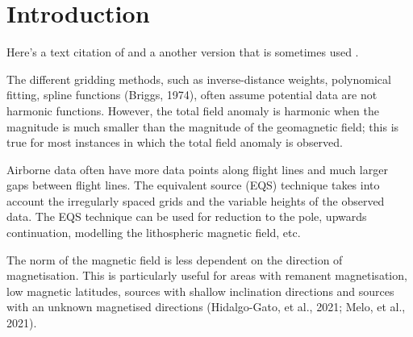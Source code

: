 
\section{Introduction}

Here's a text citation of \citet{OliveiraJr2015}
and a another version that is sometimes used \citep{OliveiraJr2015}.

The different gridding methods, such as inverse-distance weights, polynomical fitting, spline functions (Briggs, 1974), often assume potential data are not harmonic functions. However, the total field anomaly is harmonic when the magnitude is much smaller than the magnitude of the geomagnetic field; this is true for most instances in which the total field anomaly is observed. 

Airborne data often have more data points along flight lines and much larger gaps between flight lines. The equivalent source (EQS) technique takes into account the irregularly spaced grids and the variable heights of the observed data. The EQS technique can be used for reduction to the pole, upwards continuation, modelling the lithospheric magnetic field, etc.

The norm of the magnetic field is less dependent on the direction of magnetisation. This is particularly useful for areas with remanent magnetisation, low magnetic latitudes, sources with shallow inclination directions and sources with an unknown magnetised directions (Hidalgo-Gato, et al., 2021; Melo, et al., 2021).

\lipsum[1-3]


